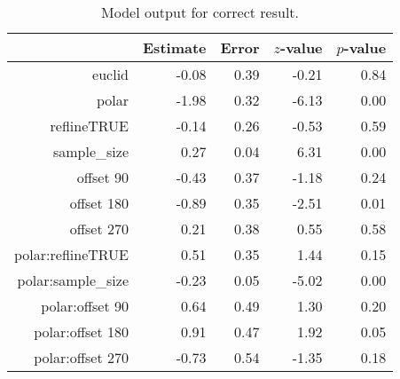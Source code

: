 \begin{table}[ht]
\begin{center}
\resizebox{\linewidth}{!} {
\begin{tabular}{rrrrr}
  \hline
 & Estimate & Error & $z$-value & $p$-value \\ 
  \hline
euclid & -0.08 & 0.39 & -0.21 & 0.84 \\ 
polar & -1.98 & 0.32 & -6.13 & 0.00 \\ [1pt]
  reflineTRUE & -0.14 & 0.26 & -0.53 & 0.59 \\ [1pt]
  sample\_size & 0.27 & 0.04 & 6.31 & 0.00 \\ [1pt]
  offset 90 & -0.43 & 0.37 & -1.18 & 0.24 \\ 
  offset 180 & -0.89 & 0.35 & -2.51 & 0.01 \\ 
  offset 270 & 0.21 & 0.38 & 0.55 & 0.58 \\ [1pt]
  polar:reflineTRUE & 0.51 & 0.35 & 1.44 & 0.15 \\ [1pt]
  polar:sample\_size & -0.23 & 0.05 & -5.02 & 0.00 \\ [1pt]
  polar:offset 90 & 0.64 & 0.49 & 1.30 & 0.20 \\ 
  polar:offset 180 & 0.91 & 0.47 & 1.92 & 0.05 \\ 
  polar:offset 270 & -0.73 & 0.54 & -1.35 & 0.18 \\
   \hline
\end{tabular}}
\end{center}
\caption{\label{tbl:correct} Model output for correct result. }
\end{table}


